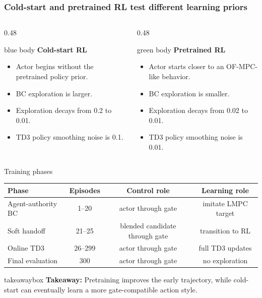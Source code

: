 \documentclass[aspectratio=169]{beamer}
\newcommand{\takeawaybox}[1]{%
\vspace{0.03cm}
\begin{center}
\begin{beamercolorbox}[wd=0.94\textwidth,sep=3pt,center,rounded=true,shadow=false]{takeawaybox}
\scriptsize
\textbf{\textcolor{maroon1}{Takeaway:}} #1
\end{beamercolorbox}
\end{center}
}
\begin{document}
\begin{frame}
\frametitle{\large \textbf{Cold-start and pretrained RL test different learning priors}}
\scriptsize

\begin{columns}[T,onlytextwidth]
\begin{column}{0.48\textwidth}
\begin{beamercolorbox}[rounded=true,sep=4pt]{blue body}
\textbf{\textcolor{maccblue}{Cold-start RL}}
\begin{itemize}\justifying
  \setlength\itemsep{0.35ex}
  \item Actor begins without the pretrained policy prior.
  \item BC exploration is larger.
  \item Exploration decays from 0.2 to 0.01.
  \item TD3 policy smoothing noise is 0.1.
\end{itemize}
\end{beamercolorbox}
\end{column}

\begin{column}{0.48\textwidth}
\begin{beamercolorbox}[rounded=true,sep=4pt]{green body}
\textbf{\textcolor{maccgreen}{Pretrained RL}}
\begin{itemize}\justifying
  \setlength\itemsep{0.35ex}
  \item Actor starts closer to an OF-MPC-like behavior.
  \item BC exploration is smaller.
  \item Exploration decays from 0.02 to 0.01.
  \item TD3 policy smoothing noise is 0.01.
\end{itemize}
\end{beamercolorbox}
\end{column}
\end{columns}

\vspace{0.15cm}
\begin{block}{Training phases}
\begin{center}
\begin{tabular}{lccc}
\toprule
Phase & Episodes & Control role & Learning role \\
\midrule
Agent-authority BC & 1--20 & actor through gate & imitate LMPC target \\
Soft handoff & 21--25 & blended candidate through gate & transition to RL \\
Online TD3 & 26--299 & actor through gate & full TD3 updates \\
Final evaluation & 300 & actor through gate & no exploration \\
\bottomrule
\end{tabular}
\end{center}
\end{block}

\takeawaybox{Pretraining improves the early trajectory, while cold-start can eventually learn a more gate-compatible action style.}
\end{frame}
\end{document}
